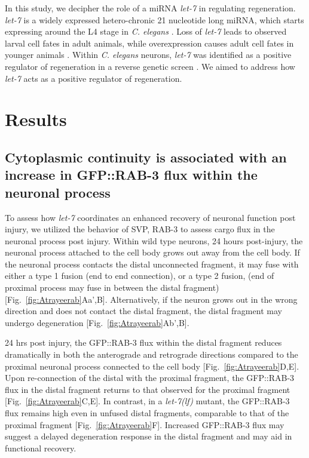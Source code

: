 \begin{appendices}
In this study, we decipher the role of a \gls{miRNA} \textit{let-7} in regulating regeneration. \textit{let-7} is a widely expressed hetero-chronic 21 nucleotide long miRNA, which starts expressing around the L4 stage in \textit{C. elegans} \parencite{reinhart2000}. Loss of \textit{let-7} leads to observed larval cell fates in adult animals, while overexpression causes adult cell fates in younger animals \parencite{reinhart2000}. Within \textit{C. elegans} neurons, \textit{let-7} was identified as a positive regulator of regeneration in a reverse genetic screen \parencite{chen2011}. We aimed to address how \textit{let-7} acts as a positive regulator of regeneration.

\section{Results}

\subsection{Cytoplasmic continuity is associated with an increase in GFP::RAB-3 flux within the neuronal process}

To assess how \textit{let-7} coordinates an enhanced recovery of neuronal function post injury, we utilized the behavior of SVP, RAB-3 to assess cargo flux in the neuronal process post injury. Within wild type neurons, 24 hours post-injury, the neuronal process attached to the cell body grows out away from the cell body. If the neuronal process contacts the distal unconnected fragment, it may fuse with either a type 1 fusion (end to end connection), or a type 2 fusion, (end of proximal process may fuse in between the distal fragment) [Fig.~\ref{fig:Atrayeerab}Aa',B]. Alternatively, if the neuron grows out in the wrong direction and does not contact the distal fragment, the distal fragment may undergo degeneration [Fig.~\ref{fig:Atrayeerab}Ab',B].

24 hrs post injury, the GFP::RAB-3 flux within the distal fragment reduces dramatically in both the anterograde and retrograde directions compared to the proximal neuronal process connected to the cell body [Fig.~\ref{fig:Atrayeerab}D,E]. Upon re-connection of the distal with the proximal fragment, the GFP::RAB-3 flux in the distal fragment returns to that observed for the proximal fragment [Fig.~\ref{fig:Atrayeerab}C,E]. In contrast, in a \textit{let-7(lf)} mutant, the GFP::RAB-3 flux remains high even in unfused distal fragments, comparable to that of the proximal fragment [Fig.~\ref{fig:Atrayeerab}F]. Increased GFP::RAB-3 flux may suggest a delayed degeneration response in the distal fragment and may aid in functional recovery. 


\end{appendices}
